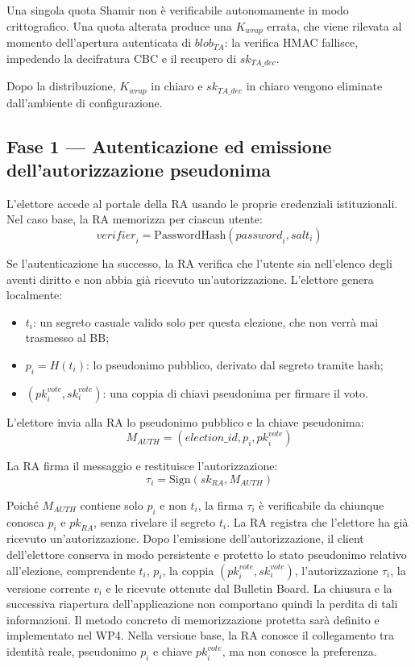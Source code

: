 \documentclass[12pt,a4paper]{article}
\newcommand{\pk}{\mathit{pk}}
\newcommand{\sk}{\mathit{sk}}
\begin{document}
Una singola quota Shamir non \`e verificabile autonomamente in modo crittografico. Una quota alterata produce una $K_{\mathit{wrap}}$ errata, che viene rilevata al momento dell'apertura autenticata di $\mathit{blob}_{\mathit{TA}}$: la verifica HMAC fallisce, impedendo la decifratura CBC e il recupero di $\sk_{\mathit{TA\_dec}}$.

Dopo la distribuzione, $K_{\mathit{wrap}}$ in chiaro e $\sk_{\mathit{TA\_dec}}$ in chiaro vengono eliminate dall'ambiente di configurazione.

\subsection{Fase 1 --- Autenticazione ed emissione dell'autorizzazione pseudonima}

L'elettore accede al portale della RA usando le proprie credenziali istituzionali. Nel caso base, la RA memorizza per ciascun utente:
\[
\mathit{verifier}_i = \mathrm{PasswordHash}(\mathit{password}_i, \mathit{salt}_i)
\]

Se l'autenticazione ha successo, la RA verifica che l'utente sia nell'elenco degli aventi diritto e non abbia gi\`a ricevuto un'autorizzazione. L'elettore genera localmente:
\begin{itemize}
\item $t_i$: un segreto casuale valido solo per questa elezione, che non verr\`a mai trasmesso al BB;
\item $p_i = H(t_i)$: lo pseudonimo pubblico, derivato dal segreto tramite hash;
\item $(\pk_i^{\mathit{vote}}, \sk_i^{\mathit{vote}})$: una coppia di chiavi pseudonima per firmare il voto.
\end{itemize}

L'elettore invia alla RA lo pseudonimo pubblico e la chiave pseudonima:
\[
M_{\mathit{AUTH}} = (\mathit{election\_id}, p_i, \pk_i^{\mathit{vote}})
\]

La RA firma il messaggio e restituisce l'autorizzazione:
\[
\tau_i = \mathrm{Sign}(\sk_{\mathit{RA}}, M_{\mathit{AUTH}})
\]

Poich\'e $M_{\mathit{AUTH}}$ contiene solo $p_i$ e non $t_i$, la firma $\tau_i$ \`e verificabile da chiunque conosca $p_i$ e $\pk_{\mathit{RA}}$, senza rivelare il segreto $t_i$. La RA registra che l'elettore ha gi\`a ricevuto un'autorizzazione. Dopo l'emissione dell'autorizzazione, il client dell'elettore conserva in modo persistente e protetto lo stato pseudonimo relativo all'elezione, comprendente $t_i$, $p_i$, la coppia $(\pk_i^{\mathit{vote}}, \sk_i^{\mathit{vote}})$, l'autorizzazione $\tau_i$, la versione corrente $v_i$ e le ricevute ottenute dal Bulletin Board. La chiusura e la successiva riapertura dell'applicazione non comportano quindi la perdita di tali informazioni. Il metodo concreto di memorizzazione protetta sar\`a definito e implementato nel WP4. Nella versione base, la RA conosce il collegamento tra identit\`a reale, pseudonimo $p_i$ e chiave $\pk_i^{\mathit{vote}}$, ma non conosce la preferenza.
\end{document}
